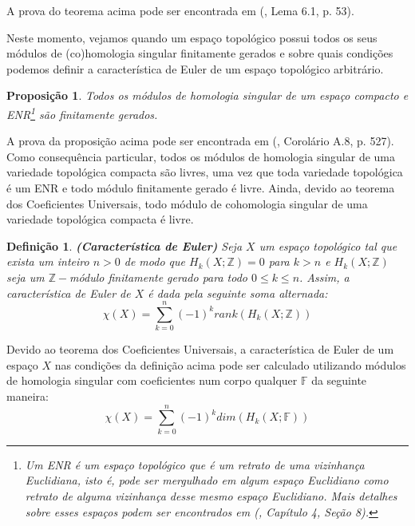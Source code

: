 \documentclass[12pt,oneside]{book} %
\newtheorem{defi}   {\hspace{0.5cm}Defini\c c\~ao}[chapter]
\newtheorem{prop}   {\hspace{0.5cm}Proposi\c c\~ao}[chapter]
\newcommand{\ds}{\displaystyle}
\newcommand{\Z}{\mathbb{Z}}
\newcommand{\F}{\mathbb{F}}
\begin{document}
\par A prova do teorema acima pode ser encontrada em (\cite{alex}, Lema 6.1, p. 53).

\par Neste momento, vejamos quando um espaço topológico possui todos os seus módulos de (co)homologia singular finitamente gerados e sobre quais condições podemos definir a característica de Euler de um espaço topológico arbitrário.

\begin{prop}
	Todos os módulos de homologia singular de um espaço compacto e ENR\footnote{Um ENR é um espaço topológico que é um retrato de uma vizinhança Euclidiana, isto é, pode ser mergulhado em algum espaço Euclidiano como retrato de alguma vizinhança desse mesmo espaço Euclidiano. Mais detalhes sobre esses espaços podem ser encontrados em (\cite{dold}, Capítulo 4, Seção 8).} são finitamente gerados.
\end{prop}

\par A prova da proposição acima pode ser encontrada em (\cite{hatcher}, Corolário A.8, p. 527). Como consequência particular, todos os módulos de homologia singular de uma variedade topológica compacta são livres, uma vez que toda variedade topológica é um ENR e todo módulo finitamente gerado é livre. Ainda, devido ao teorema dos Coeficientes Universais, todo módulo de cohomologia singular de uma variedade topológica compacta é livre.

\begin{defi}{\bf (Característica de Euler)}
	Seja $X$ um espaço topológico tal que exista um inteiro $n>0$ de modo que $H_{k}(X;\Z)=0$ para $k>n$ e $H_{k}(X;\Z)$ seja um $\Z-$módulo finitamente gerado para todo $0\leq k\leq n$. Assim, a característica de Euler de $X$ é dada pela seguinte soma alternada:
	$$ \chi(X)=\ds\sum_{k=0}^{n}(-1)^{k}rank(H_{k}(X;\Z)) $$
\end{defi}

\par Devido ao teorema dos Coeficientes Universais, a característica de Euler de um espaço $X$ nas condições da definição acima pode ser calculado utilizando módulos de homologia singular com coeficientes num corpo qualquer $\F$ da seguinte maneira:
$$ \chi(X)=\ds\sum_{k=0}^{n}(-1)^{k}dim(H_{k}(X;\F)) $$
\end{document}
